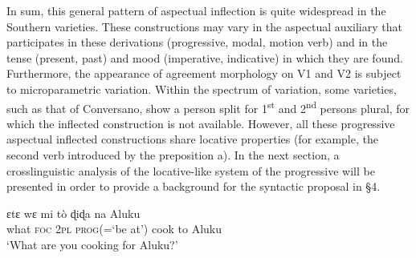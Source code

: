 \documentclass[output=paper]{langsci/langscibook}
\begin{document}
In sum, this general pattern of aspectual inflection is quite widespread in the Southern varieties. These constructions may vary in the aspectual auxiliary that participates in these derivations (progressive, modal, motion verb) and in the tense (present, past) and mood (imperative, indicative) in which they are found. Furthermore, the appearance of agreement morphology on V1 and V2 is subject to microparametric variation. Within the spectrum of variation, some varieties, such as that of Conversano, show a person split for 1\textsuperscript{st} and 2\textsuperscript{nd} persons plural, for which the inflected construction is not available. However, all these progressive aspectual inflected constructions share locative properties (for example, the second verb introduced by the preposition a). In the next section, a crosslinguistic analysis of the locative-like system of the progressive will be presented in order to provide a background for the syntactic proposal in §4.

\ea%
    \label{ex:lorusso:21}
    \gll ɛtɛ   wɛ   mi   tò       ɖiɖa   na  Aluku \\
          what  \textsc{foc} \textsc{2pl} \textsc{prog}(=‘be at’)   cook  to  Aluku \\
    \glt ‘What are you cooking for Aluku?’ \citep{Aboh2004} 
\z   
\end{document}
